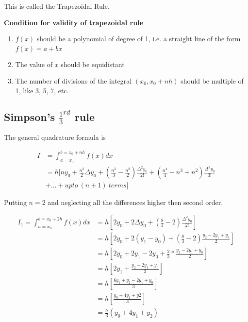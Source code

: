 \documentclass{article}
\begin{document}
              This is called the Trapezoidal Rule.
              
              \pagebreak
              \textbf{Condition for validity of trapezoidal rule}
              \begin{enumerate}
                \item $f(x)$ should be a polynomial of degree of 1, i.e. a 
                  straight line of the form $f(x)=a+bx$
                \item The value of $x$ should be equidistant
                \item The number of divisions of the integral $(x_0,x_0+nh)$ 
                  should be multiple of 1, like 3, 5, 7, etc.
              \end{enumerate}
            
            \subsection{Simpson's $\frac{1}{3}^{rd}$ rule}
              The general quadrature formula is 

              \begin{align*}
                I &=\int_{a=x_0}^{b=x_0+nh}f(x)dx\\
                  &= h[ny_0+\frac{n^2}{2}\Delta y_0+(\frac{n^3}{3}-\frac{n^2}{2})\frac{\Delta^2y_0}{2!}+(\frac{n^4}{4}-n^3+n^2)\frac{\Delta^3y_0}{3!}\\
                  &+ \dots+upto\ (n+1)\ terms]
              \end{align*}

              Putting $n=2$ and neglecting all the differences higher then second order.

              \begin{align*}
                I_1=\int_{a=x_0}^{b=x_0+2h}f(x)dx &= h[2y_0+2\Delta y_0+(\frac{8}{3}-2)\frac{\Delta^2y_0}{2!}]\\
                                                  &= h[2y_0+2(y_1-y_0)+(\frac{8}{3}-2)\frac{y_2-2y_1+y_0}{2}]\\
                                                  &= h[2y_0+2y_1-2y_0+\frac{2}{3}*\frac{y_2-2y_1+y_0}{2}]\\
                                                  &= h[2y_1+\frac{y_2-2y_1+y_0}{3}]\\
                                                  &= h[\frac{6y_1+y_2-2y_1+y_0}{3}]\\
                                                  &= h[\frac{y_0+4y_1+y2}{3}]\\
                                                  &= \frac{h}{3}(y_0+4y_1+y_2)
              \end{align*}
              
\end{document}
